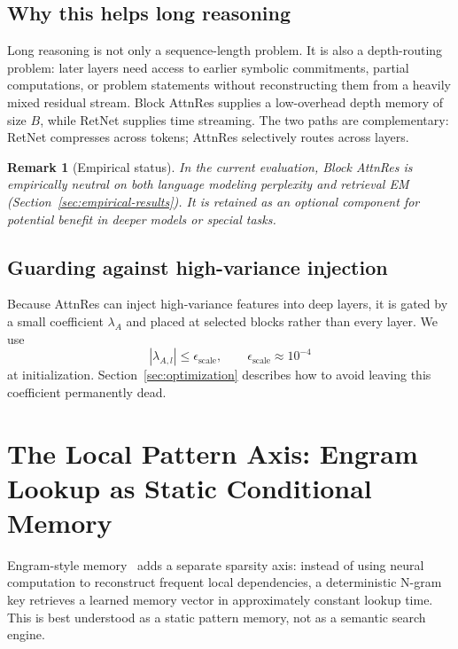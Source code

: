 \documentclass[preprint,12pt]{elsarticle}
\newtheorem{remark}[theorem]{Remark}
\begin{document}
\subsection{Why this helps long reasoning}

Long reasoning is not only a sequence-length problem. It is also a depth-routing problem: later layers need access to earlier symbolic commitments, partial computations, or problem statements without reconstructing them from a heavily mixed residual stream. Block AttnRes supplies a low-overhead depth memory of size $B$, while RetNet supplies time streaming. The two paths are complementary: RetNet compresses across tokens; AttnRes selectively routes across layers.

\begin{remark}[Empirical status]
In the current evaluation, Block AttnRes is empirically neutral on both language modeling perplexity and retrieval EM (Section~\ref{sec:empirical-results}). It is retained as an optional component for potential benefit in deeper models or special tasks.
\end{remark}

\subsection{Guarding against high-variance injection}

Because AttnRes can inject high-variance features into deep layers, it is gated by a small coefficient $\lambda_A$ and placed at selected blocks rather than every layer. We use
\begin{equation}
|\lambda_{A,l}|\leq \epsilon_{\mathrm{scale}},\qquad \epsilon_{\mathrm{scale}}\approx 10^{-4}
\end{equation}
at initialization. Section~\ref{sec:optimization} describes how to avoid leaving this coefficient permanently dead.

\section{The Local Pattern Axis: Engram Lookup as Static Conditional Memory}

Engram-style memory~\cite{engram} adds a separate sparsity axis: instead of using neural computation to reconstruct frequent local dependencies, a deterministic N-gram key retrieves a learned memory vector in approximately constant lookup time. This is best understood as a static pattern memory, not as a semantic search engine.
\end{document}
